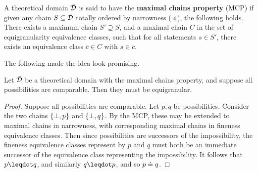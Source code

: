 \documentclass[10pt, onecolumn, longbibliography, nofootinbib]{revtex4-2}
\begin{document}
\begin{defn}
A theoretical domain $\bar{\mathcal{D}}$ is said to have the \textbf{maximal chains property} (MCP) if given any chain $S\subseteq\bar{\mathcal{D}}$ totally ordered by narrowness ($\preccurlyeq$), the following holds. There exists a maximum chain $S'\supseteq S$, and a maximal chain $C$ in the set of equigranularity equivalence classes, such that for all statements $s \in S'$, there exists an equivalence class $\overline{c}\in C$ with $s\in \overline{c}$.
\end{defn}

The following made the idea look promising.

\begin{prop}\label{chainimpliesuniform}
Let $\bar{\mathcal{D}}$ be a theoretical domain with the maximal chains property, and suppose all possibilities are comparable. Then they must be equigranular.
\end{prop}
\begin{proof}
Suppose all possibilities are comparable. Let $p,q$ be possibilities. Consider the two chains $\{\bot, p\}$ and $\{\bot, q\}$. By the MCP, these may be extended to maximal chains in narrowness, with corresponding maximal chains in fineness equivalence classes. Then since possibilities are successors of the impossibility, the fineness equivalence classes represent by $p$ and $q$ must both be an immediate successor of the equivalence class representing the impossibility. It follows that $p\finer q$, and similarly $q\finer p$, and so $p\doteq q$. 
\end{proof}
\end{document}
